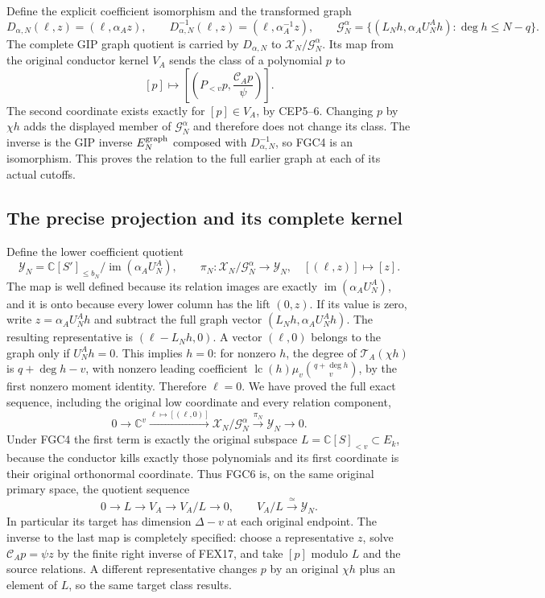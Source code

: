 \documentclass[11pt,a4paper]{article}
\begin{document}
Define the explicit coefficient isomorphism and the transformed graph
\[
 D_{\alpha,N}(\ell,z)=(\ell,\alpha_Az),\qquad
 D_{\alpha,N}^{-1}(\ell,z)=(\ell,\alpha_A^{-1}z),\qquad
 \mathscr G_N^\alpha=
 \{(L_Nh,\alpha_AU_N^Ah):\deg h\le N-q\}.
 \tag{FGC3}
\]
The complete GIP graph quotient is carried by $D_{\alpha,N}$ to
$\mathscr X_N/\mathscr G_N^\alpha$. Its map from the original
conductor kernel $V_A$ sends the class of a polynomial $p$ to
\[
 [p]\longmapsto
 \left[\left(P_{<v}p,\frac{\mathcal C_Ap}{\psi}\right)\right].
 \tag{FGC4}
\]
The second coordinate exists exactly for $[p]\in V_A$, by CEP5--6.
Changing $p$ by $\chi h$ adds the displayed member of
$\mathscr G_N^\alpha$ and therefore does not change its class.
The inverse is the GIP inverse $E_N^{\rm graph}$ composed with
$D_{\alpha,N}^{-1}$, so FGC4 is an isomorphism. This proves the
relation to the full earlier graph at each of its actual cutoffs.

\subsection{The precise projection and its complete kernel}

Define the lower coefficient quotient
\[
 \mathscr Y_N=
 \mathbb C[S']_{\le b_N}/\operatorname{im}(\alpha_AU_N^A),
 \qquad
 \pi_N:\mathscr X_N/\mathscr G_N^\alpha\longrightarrow\mathscr Y_N,
 \quad[(\ell,z)]\longmapsto[z].
 \tag{FGC5}
\]
The map is well defined because its relation images are exactly
$\operatorname{im}(\alpha_AU_N^A)$, and it is onto because every
lower column has the lift $(0,z)$. If its value is zero, write
$z=\alpha_AU_N^Ah$ and subtract the full graph vector
$(L_Nh,\alpha_AU_N^Ah)$. The resulting representative is
$(\ell-L_Nh,0)$. A vector $(\ell,0)$ belongs to the graph only
if $U_N^Ah=0$. This implies $h=0$: for nonzero $h$, the degree
of $\mathcal T_A(\chi h)$ is $q+\deg h-v$, with nonzero leading
coefficient $\operatorname{lc}(h)\mu_v\binom{q+\deg h}{v}$, by the first nonzero
moment identity. Therefore $\ell=0$. We have proved the full
exact sequence, including the original low coordinate and every
relation component,
\[
 0\longrightarrow\mathbb C^v
  \xrightarrow{\ell\mapsto[(\ell,0)]}
 \mathscr X_N/\mathscr G_N^\alpha
  \xrightarrow{\pi_N}\mathscr Y_N\longrightarrow0.
 \tag{FGC6}
\]
Under FGC4 the first term is exactly the original subspace
$L=\mathbb C[S]_{<v}\subset E_k$, because the conductor kills
exactly those polynomials and its first coordinate is their original
orthonormal coordinate. Thus FGC6 is, on the same original primary
space, the quotient sequence
\[
 0\longrightarrow L\longrightarrow V_A
       \longrightarrow V_A/L\longrightarrow0,
 \qquad V_A/L\xrightarrow{\ \simeq\ }\mathscr Y_N.
 \tag{FGC7}
\]
In particular its target has dimension $\Delta-v$ at each original
endpoint. The inverse to the last map is completely specified: choose
a representative $z$, solve $\mathcal C_Ap=\psi z$ by the finite
right inverse of FEX17, and take $[p]$ modulo $L$ and the source
relations. A different representative changes $p$ by an original
$\chi h$ plus an element of $L$, so the same target class results.
\end{document}
